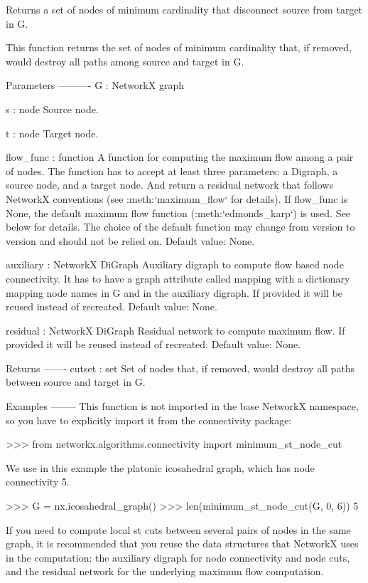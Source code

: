 \begin{DoxyVerb}Returns a set of nodes of minimum cardinality that disconnect source
from target in G.

This function returns the set of nodes of minimum cardinality that,
if removed, would destroy all paths among source and target in G.

Parameters
----------
G : NetworkX graph

s : node
    Source node.

t : node
    Target node.

flow_func : function
    A function for computing the maximum flow among a pair of nodes.
    The function has to accept at least three parameters: a Digraph,
    a source node, and a target node. And return a residual network
    that follows NetworkX conventions (see :meth:`maximum_flow` for
    details). If flow_func is None, the default maximum flow function
    (:meth:`edmonds_karp`) is used. See below for details. The choice
    of the default function may change from version to version and
    should not be relied on. Default value: None.

auxiliary : NetworkX DiGraph
    Auxiliary digraph to compute flow based node connectivity. It has
    to have a graph attribute called mapping with a dictionary mapping
    node names in G and in the auxiliary digraph. If provided
    it will be reused instead of recreated. Default value: None.

residual : NetworkX DiGraph
    Residual network to compute maximum flow. If provided it will be
    reused instead of recreated. Default value: None.

Returns
-------
cutset : set
    Set of nodes that, if removed, would destroy all paths between
    source and target in G.

Examples
--------
This function is not imported in the base NetworkX namespace, so you
have to explicitly import it from the connectivity package:

>>> from networkx.algorithms.connectivity import minimum_st_node_cut

We use in this example the platonic icosahedral graph, which has node
connectivity 5.

>>> G = nx.icosahedral_graph()
>>> len(minimum_st_node_cut(G, 0, 6))
5

If you need to compute local st cuts between several pairs of
nodes in the same graph, it is recommended that you reuse the
data structures that NetworkX uses in the computation: the
auxiliary digraph for node connectivity and node cuts, and the
residual network for the underlying maximum flow computation.


\end{DoxyVerb}
